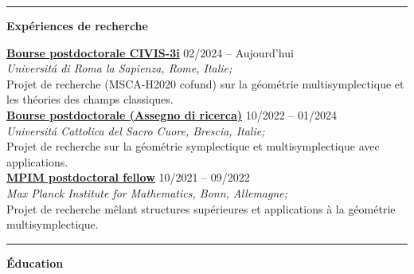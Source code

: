 \documentclass[a4paper]{article}
\newcommand{\block}[1]{\hrule \vspace{0.2cm} \textbf{\Large #1} \vspace{0.2cm}}
\newcommand{\voice}[5]{\href{#4}{\textbf{#1}} \hfill #2 \\ \textit{#3} \\ {\small #5} \vspace{0.2cm} \\}
\begin{document}
\begin{minipage}[t]{0.6\columnwidth}
    

    \block{Expériences de recherche}

    
    \voice{Bourse postdoctorale CIVIS-3i}
        {02/2024  -- Aujourd'hui}
        {Universit\'a di Roma la Sapienza, Rome, Italie;}
        {https://civis3i.univ-amu.fr/en/civis3i-alliance-programme}       
        {Projet de recherche (MSCA-H2020 cofund) sur la géométrie multisymplectique et les théories des champs classiques.}
    \voice{Bourse postdoctorale (Assegno di ricerca)}
        {10/2022  -- 01/2024}
        {Universit\'a Cattolica del Sacro Cuore, Brescia, Italie;}
        {https://dipartimenti.unicatt.it/dmf-home}       
        {Projet de recherche sur la géométrie symplectique et multisymplectique avec applications.}
    \voice{MPIM postdoctoral fellow}
        {10/2021  -- 09/2022}
        {Max Planck Institute for Mathematics, Bonn, Allemagne;}
        {https://www.mpim-bonn.mpg.de/}       
        {Projet de recherche mêlant structures supérieures et applications à la géométrie multisymplectique.}

        




    \block{Éducation}


\end{minipage}
\end{document}
